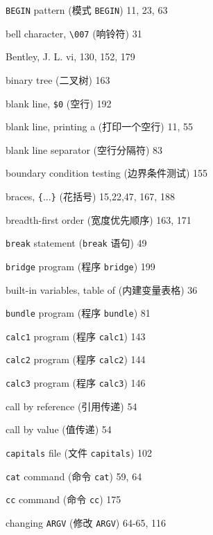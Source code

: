 \begin{multicols}{3}
\hangindent=3pc  \verb'BEGIN' pattern (模式 \verb'BEGIN') 11, 23, 63

\hangindent=3pc  bell character, \verb'\007' (响铃符) 31

\hangindent=3pc  Bentley, J. L. vi, 130, 152, 179

\hangindent=3pc  binary tree (二叉树) 163

\hangindent=3pc  blank line, \verb'$0' (空行) 192

\hangindent=3pc  blank line, printing a (打印一个空行) 11, 55

\hangindent=3pc  blank line separator (空行分隔符) 83

\hangindent=3pc  boundary condition testing (边界条件测试) 155

\hangindent=3pc  braces, \verb'{'...\verb'}' (花括号) 15,22,47, 167, 188

\hangindent=3pc  breadth-first order (宽度优先顺序) 163, 171

\hangindent=3pc  \verb'break' statement (\verb'break' 语句) 49

\hangindent=3pc  \verb'bridge' program (程序 \verb'bridge') 199

\hangindent=3pc  built-in variables, table of (内建变量表格) 36

\hangindent=3pc  \verb'bundle' program (程序 \verb'bundle') 81

\hangindent=3pc  \verb'calc1' program (程序 \verb'calc1') 143

\hangindent=3pc  \verb'calc2' program (程序 \verb'calc2') 144

\hangindent=3pc  \verb'calc3' program (程序 \verb'calc3') 146

\hangindent=3pc  call by reference (引用传递) 54

\hangindent=3pc  call by value (值传递) 54

\hangindent=3pc  \verb'capitals' file (文件 \verb'capitals') 102

\hangindent=3pc  \verb'cat' command (命令 \verb'cat') 59, 64

\hangindent=3pc  \verb'cc' command (命令 \verb'cc') 175

\hangindent=3pc  changing \verb'ARGV' (修改 \verb'ARGV') 64-65, 116


\end{multicols}
